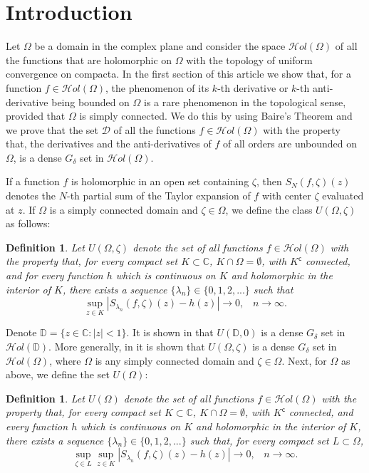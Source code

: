 \documentclass[11pt,twoside,a4paper]{article}
\newtheorem{definition}[theorem]{Definition}
\theoremstyle{remark}
\def\d{\delta}
\newcommand{\hol}{{\mathcal Hol}}
\newcommand{\holo}{{\mathcal Hol}(\Omega)}
\newcommand{\uo}{U(\Omega)}
\newcommand{\uoz}                                                                                                    {U(\Omega, \zeta)}
\begin{document}
\section{Introduction}
\par
Let $\Omega$ be a domain in the complex plane and consider the space $\holo$ of all the functions that are holomorphic on $\Omega$ with the topology of uniform convergence on compacta. In the first section of this article we show that, for a function $f \in \holo$, the phenomenon of its $k$-th derivative or $k$-th anti-derivative being bounded on $\Omega$ is a rare phenomenon in the topological sense, provided that $\Omega$ is simply connected. We do this by using Baire's Theorem and we prove that the set $\mathcal{D}$ of all the functions $f \in \holo$ with the property that, the derivatives and the anti-derivatives of $f$ of all orders are unbounded on $\Omega$, is a dense $G_\d$ set in $\holo$.
\par
If a function $f$ is holomorphic in an open set containing $\zeta$, then $S_N(f,\zeta)(z)$ denotes the $N$-th partial sum of the Taylor expansion of $f$ with center $\zeta$ evaluated at $z$.
If $\Omega$ is a simply connected domain and $\zeta \in \Omega$, we define the class $\uoz$ as follows:
\begin{definition}
  Let $\uoz$ denote the set of all functions $f \in \holo$ with the property that, for every compact set $K \subset \mathbb{C}$, $K \cap \Omega = \emptyset$, with $K^{\mathsf{c}}$ connected, and for every function $h$ which is continuous on $K$ and holomorphic in the interior of $K$, there exists a sequence $\{\lambda_n\} \in \{0,1,2,...\}$ such that
  \begin{equation*}
  \sup\limits_{z \in K}|S_{\lambda_n}(f,\zeta)(z)-h(z)| \longrightarrow 0, \hspace{10pt} n \rightarrow \infty .
\end{equation*}
\end{definition}

Denote $\mathbb{D}= \{z \in \mathbb{C}: |z|<1 \}$. It is shown in \cite{nestoridis1996universal} that $U(\mathbb{D},0)$ is a  dense $G_\d$ set in $\hol (\mathbb{D})$. More generally, in \cite{nestoridis1999extension} it is shown that $\uoz$ is a dense $G_\d$ set in $\holo$, where $\Omega$ is any simply connected domain and $\zeta \in \Omega$. Next, for $\Omega$ as above, we define the set $\uo$:
\begin{definition}
   Let $\uo$ denote the set of all functions $f \in \holo$ with the property that,  for every compact set $K \subset \mathbb{C}$, $K \cap \Omega = \emptyset$, with $K^{\mathsf{c}}$ connected, and every function $h$ which is continuous on $K$ and holomorphic in the interior of $K$, there exists a sequence $\{\lambda_n\} \in \{0,1,2,...\}$ such that, for every compact set $L \subset \Omega$,
\begin{equation*}
  \sup\limits_{\zeta \in L}\sup\limits_{z \in K}|S_{\lambda_n}(f,\zeta)(z)-h(z)| \longrightarrow 0, \hspace{10pt} n \rightarrow \infty.
\end{equation*}
\end{definition}
\end{document}
